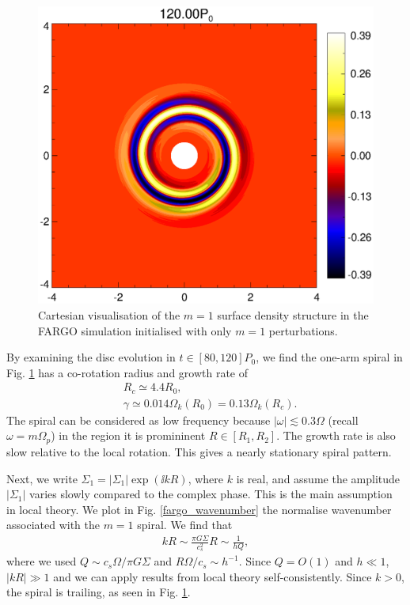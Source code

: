 \begin{figure}
  \includegraphics[width=\linewidth]{figures/polarxy2_dens120_fargo.ps}
  \caption{Cartesian visualisation of the $m=1$ surface density
    structure in the FARGO simulation initialised with only $m=1$
    perturbations. 
    \label{2d_fargo_viz}} 
\end{figure}   

By examining the disc evolution in $t\in[80,120]P_0$, we find the
one-arm spiral in Fig. \ref{2d_fargo_viz} has a 
co-rotation radius and growth rate of
\begin{align*}
  &R_c \simeq 4.4R_0,\\
  &\gamma\simeq 0.014\Omega_k(R_0) = 0.13\Omega_k(R_c). 
\end{align*}
The spiral can be considered as low frequency because $|\omega|
\lesssim 0.3\Omega$ (recall $\omega = 
m\Omega_p$) in the region it is promininent $R\in[R_{1},R_{2}]$. The
growth rate is also slow relative to the local rotation. This gives a
nearly stationary spiral pattern.   


Next, we write $\Sigma_1 = 
|\Sigma_1|\exp{(\ii kR)}$, where $k$ is real, and assume the amplitude
$|\Sigma_1|$ varies slowly compared to the complex phase. This is the
main assumption in local theory. We plot in
Fig. \ref{fargo_wavenumber} the normalise wavenumber associated with
the $m=1$ spiral. We find that
\begin{align*}
  kR \sim \frac{\pi G \Sigma}{c_s^2}R \sim \frac{1}{hQ}, 
\end{align*}
where we used $Q\sim c_s\Omega/\pi G \Sigma$ and $R\Omega/c_s\sim
h^{-1}$. Since $Q=O(1)$ and $h\ll 1$, $|kR|\gg 1$ and we 
can apply results from local theory self-consistently. Since $k>0$,
the spiral is trailing, as seen in Fig. \ref{2d_fargo_viz}. 

